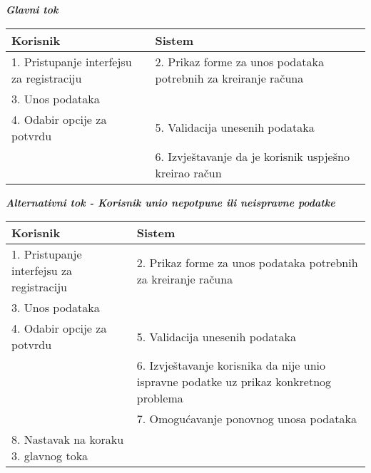 \documentclass[12pt, a4paper]{report}
\begin{document}
\begin{flushleft}
\textbf{\textit{Glavni tok}}
\begin{tabular}{|m{7cm}|m{7cm}|}
\hline
\textbf{Korisnik} & \textbf{Sistem} \\
\hline
1. Pristupanje interfejsu za registraciju & 2. Prikaz forme za unos podataka potrebnih za kreiranje računa \\
\hline
3. Unos podataka &  \\
\hline
4. Odabir opcije za potvrdu & 5. Validacija unesenih podataka \\
\hline
& 6. Izvještavanje da je korisnik uspješno kreirao račun \\
\hline
\end{tabular} \newline \newline

\textbf{\textit{Alternativni tok - Korisnik unio nepotpune ili neispravne podatke}}

\begin{tabular}{|m{7cm}|m{7cm}|}
\hline
\textbf{Korisnik} & \textbf{Sistem} \\
\hline
1. Pristupanje interfejsu za registraciju & 2. Prikaz forme za unos podataka potrebnih za kreiranje računa \\
\hline
3. Unos podataka &  \\
\hline
4. Odabir opcije za potvrdu & 5. Validacija unesenih podataka \\
\hline
& 6. Izvještavanje  korisnika da nije unio ispravne podatke uz prikaz konkretnog problema \\
\hline
& 7. Omogućavanje ponovnog unosa podataka \\
\hline
8. Nastavak na koraku 3. glavnog toka & \\
\hline
\end{tabular} \newline \newline

\newpage


\end{flushleft}
\end{document}
